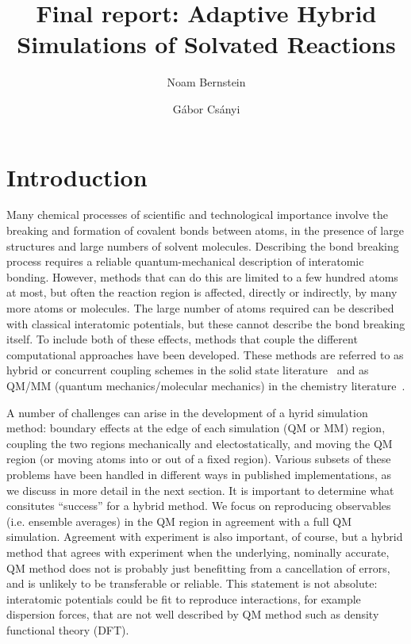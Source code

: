 \documentclass[11pt]{revtex4}
\begin{document}
\title{Final report: Adaptive Hybrid Simulations of Solvated Reactions}

\author{Noam Bernstein}

\author{G\'abor Cs\'anyi}

\maketitle

\section{Introduction}

Many chemical processes of scientific and technological importance
involve the breaking and formation of covalent bonds between atoms,
in the presence of large structures and large numbers of solvent
molecules.  Describing the bond breaking process requires a reliable
quantum-mechanical description of interatomic bonding.  However,
methods that can do this are limited to a few hundred atoms at most, but often
the reaction region is affected, directly or indirectly, by many
more atoms or molecules.  The large number of atoms required can
be described with classical interatomic potentials, but these cannot describe the bond breaking itself.  To include both of these
effects, methods that couple the different computational approaches
have been developed.  These methods are referred to as hybrid or
concurrent coupling schemes in the solid state
literature~\cite{curtin_model_simul_mater_sci_eng_2003a,csanyi_j_phys_condens_mater_2005a,bernstein_rep_prog_phys_2009a} and
as QM/MM (quantum mechanics/molecular mechanics) in the chemistry
literature~\cite{senn_topics_cur_chem_2007a,lin_theor_chem_acc_2005a}.

A number of challenges can arise in the development of a hyrid
simulation method: boundary effects at the edge of each simulation
(QM or MM) region, coupling the two regions mechanically and
electostatically, and moving the QM region (or moving atoms into
or out of a fixed region).  Various subsets of these problems have
been handled in different ways in published implementations, as we
discuss in more detail in the next section.  It is important to
determine what consitutes ``success'' for a hybrid method.  We focus
on reproducing observables (i.e. ensemble averages) in the QM region
in agreement with a full QM simulation.  Agreement with experiment
is also important, of course, but a hybrid method that agrees with
experiment when the underlying, nominally accurate, QM method does
not is probably just benefitting from a cancellation of errors, and
is unlikely to be transferable or reliable.  This statement is not
absolute: interatomic potentials could be fit to reproduce interactions,
for example dispersion forces, that are not well described by QM
method such as density functional theory (DFT).
\end{document}
